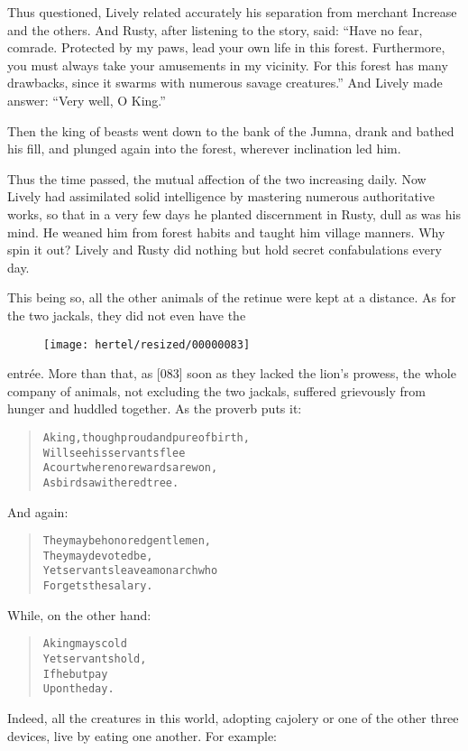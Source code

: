 \documentclass[article, twoside, 10pt]{memoir}
\renewenvironment{verbatim}{%
\begin{quote}%
\vskip -10pt%
\begin{alltt}\normalfont\small}{\end{alltt}%
\end{quote}%
\vskip -10pt
} %
\begin{document}
Thus questioned, Lively related accurately his separation from
merchant Increase and the others. And Rusty, after listening to the
story, said:
``Have no fear, comrade. Protected by my paws, lead your own life in this forest. Furthermore, you must always take your amusements in my vicinity. For this forest has many drawbacks, since it swarms with numerous savage creatures.''
And Lively made answer: ``Very well, O King.''

Then the king of beasts went down to the bank of the Jumna, drank
and bathed his fill, and plunged again into the forest, wherever
inclination led him.

Thus the time passed, the mutual affection of the two increasing
daily. Now Lively had assimilated solid intelligence by mastering
numerous authoritative works, so that in a very few days he planted
discernment in Rusty, dull as was his mind. He weaned him from
forest habits and taught him village manners. Why spin it out?
Lively and Rusty did nothing but hold secret confabulations every
day.

This being so, all the other animals of the retinue were kept at a
distance. As for the two jackals, they did not even have the
\begin{figure}[p]\texttt{[image: hertel/resized/00000083]}\end{figure}entrée. More than that, as [083] soon as they lacked the lion's
prowess, the whole company of animals, not excluding the two
jackals, suffered grievously from hunger and huddled together. As
the proverb puts it:

\begin{verbatim}
A king, though proud and pure of birth,
    Will see his servants flee
A court where no rewards are won,
    As birds a withered tree.
\end{verbatim}
And again:

\begin{verbatim}
They may be honored gentlemen,
    They may devoted be,
Yet servants leave a monarch who
    Forgets the salary.
\end{verbatim}
While, on the other hand:

\begin{verbatim}
A king may scold
Yet servants hold,
If he but pay
Upon the day.
\end{verbatim}
Indeed, all the creatures in this world, adopting cajolery or one
of the other three devices, live by eating one another. For
example:
\end{document}
